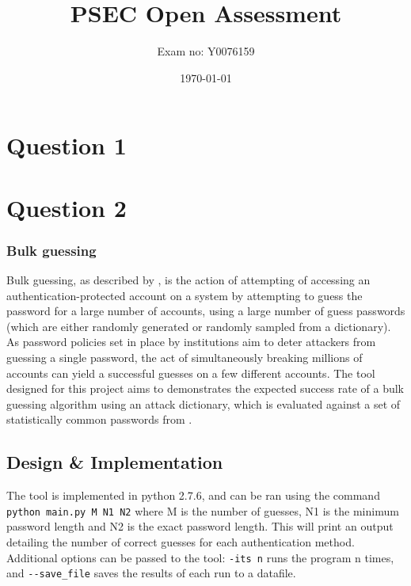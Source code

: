 \documentclass[british,10pt,a4paper]{article}
\begin{document}
\title{PSEC Open Assessment}
\author{Exam no: Y0076159}
\date{\today}
\maketitle
\tableofcontents
\clearpage

\section{Question 1}
\subsection{}
\clearpage


\section{Question 2}

\subsubsection{Bulk guessing}
Bulk guessing, as described by \citet{Florencio2007-yp}, is the action of attempting of accessing an authentication-protected account on a system by attempting to guess the password for a large number of accounts, using a large number of guess passwords (which are either randomly generated or randomly sampled from a dictionary). As password policies set in place by institutions aim to deter attackers from guessing a single password, the act of simultaneously breaking millions of accounts can yield a successful guesses on a few different accounts. The tool designed for this project aims to demonstrates the expected success rate of a bulk guessing algorithm using an attack dictionary, which is evaluated against a set of statistically common passwords from \citet{rockyoupasswords}.

\subsection{Design \& Implementation}
The tool is implemented in python 2.7.6, and can be ran using the command \lstinline{python main.py M N1 N2} where M is the number of guesses, N1 is the minimum password length and N2 is the exact password length. This will print an output detailing the number of correct guesses for each authentication method. Additional options can be passed to the tool: \lstinline{-its n} runs the program n times, and \lstinline{--save_file} saves the results of each run to a datafile.
\end{document}
